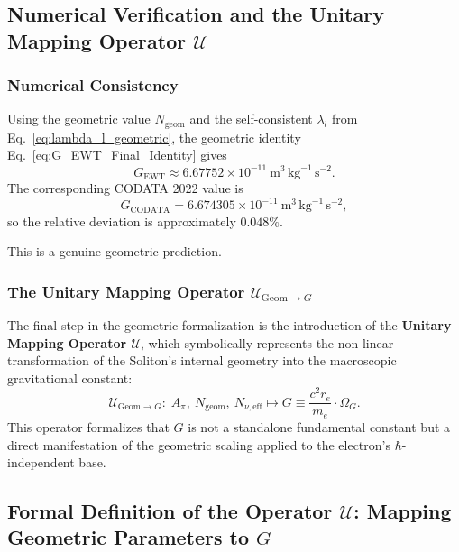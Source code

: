 \documentclass[10pt,a4paper]{article}
\begin{document}
\subsection{Numerical Verification and the Unitary Mapping Operator \(\mathcal{U}\)}

\subsubsection*{Numerical Consistency}

Using the geometric value \(N_{\text{geom}}\) and the self-consistent \(\lambda_l\) from Eq.~\eqref{eq:lambda_l_geometric}, the geometric identity Eq.~\eqref{eq:G_EWT_Final_Identity} gives
\begin{equation}
	G_{\text{EWT}} \approx 6.67752 \times 10^{-11}\ \text{m}^{3}\,\text{kg}^{-1}\,\text{s}^{-2}.
\end{equation}
The corresponding CODATA 2022 value is
\begin{equation}
	G_{\text{CODATA}} = 6.674305 \times 10^{-11}\ \text{m}^{3}\,\text{kg}^{-1}\,\text{s}^{-2},
\end{equation}
so the relative deviation is approximately \(0.048\%\).

This is a genuine geometric prediction.

\subsubsection*{The Unitary Mapping Operator \(\mathcal{U}_{\text{Geom} \to G}\)}

The final step in the geometric formalization is the introduction of the \textbf{Unitary Mapping Operator \(\mathcal{U}\)}, which symbolically represents the non-linear transformation of the Soliton's internal geometry into the macroscopic gravitational constant:
\begin{equation}
	\mathcal{U}_{\text{Geom} \to G}: \;
	A_\pi,\ N_{\text{geom}},\ N_{\nu,\text{eff}}
	\longmapsto
	G \equiv \frac{c^2 r_e}{m_e} \cdot \Omega_G .
	\label{eq:Unitary_Operator_Final}
\end{equation}
This operator formalizes that \(G\) is not a standalone fundamental constant but a direct manifestation of the geometric scaling applied to the electron's \(\hbar\)-independent base.

\subsection{Formal Definition of the Operator \(\mathcal{U}\): Mapping Geometric Parameters to \(G\)}
\label{sec:operatorU}
\end{document}
